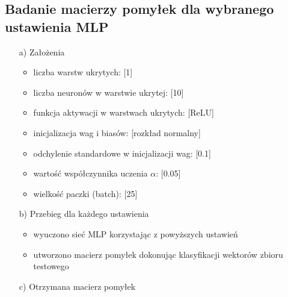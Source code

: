 \documentclass[17pt]{article}
\begin{document}
\subsection{Badanie macierzy pomyłek dla wybranego ustawienia MLP}
\vspace{4mm}
\begin{enumerate}

\item[a)] Założenia

\begin{itemize}
\item liczba warstw ukrytych: [1]
\item liczba neuronów w warstwie ukrytej: [10]
\item funkcja aktywacji w warstwach ukrytych: [ReLU]
\item inicjalizacja wag i biasów: [rozkład normalny]
\item odchylenie standardowe w inicjalizacji wag: [0.1]
\item wartość współczynnika uczenia $\alpha$: [0.05]
\item wielkość paczki (batch): [25]
\end{itemize}

\item[b)] Przebieg dla każdego ustawienia

\begin{itemize}
\item wyuczono sieć MLP korzystając z powyższych ustawień
\item utworzono macierz pomyłek dokonując klasyfikacji wektorów zbioru testowego
\end{itemize}
\item[c)] Otrzymana macierz pomyłek


\end{enumerate}
\end{document}
